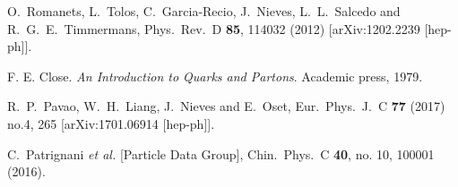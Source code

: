 \documentclass{PoS}
\begin{document}
\begin{thebibliography}{99}
  
O.~Romanets, L.~Tolos, C.~Garcia-Recio, J.~Nieves, L.~L.~Salcedo and R.~G.~E.~Timmermans,
  Phys.\ Rev.\ D {\bf 85}, 114032 (2012)
  [arXiv:1202.2239 [hep-ph]].

  
  
F. E. Close. {\it An Introduction to Quarks and Partons}.
Academic press, 1979.

  R.~P.~Pavao, W.~H.~Liang, J.~Nieves and E.~Oset,
  Eur.\ Phys.\ J.\ C {\bf 77} (2017) no.4,  265
  [arXiv:1701.06914 [hep-ph]].

  
C.~Patrignani {\it et al.} [Particle Data Group],
  Chin.\ Phys.\ C {\bf 40}, no. 10, 100001 (2016).
  

\end{thebibliography}
\end{document}
